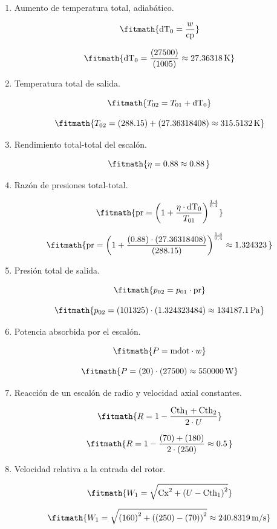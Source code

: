 \begin{enumerate}
\item Aumento de temperatura total, adiabático.

\[\fitmath{\mathrm{dT}_{0}=\frac{w}{\mathrm{cp}}}\]

\[\fitmath{\mathrm{dT}_{0}=\frac{(27500)}{(1005)}\approx 27.36318\,\mathrm{K}}\]

\item Temperatura total de salida.

\[\fitmath{T_{02}=T_{01}+\mathrm{dT}_{0}}\]

\[\fitmath{T_{02}=(288.15)+(27.36318408)\approx 315.5132\,\mathrm{K}}\]

\item Rendimiento total-total del escalón.

\[\fitmath{\eta=0.88\approx 0.88\,}\]

\item Razón de presiones total-total.

\[\fitmath{\mathrm{pr}={\left(1+\frac{\eta\cdot \mathrm{dT}_{0}}{T_{01}}\right)}^{\frac{1.4}{0.4}}}\]

\[\fitmath{\mathrm{pr}={\left(1+\frac{(0.88)\cdot (27.36318408)}{(288.15)}\right)}^{\frac{1.4}{0.4}}\approx 1.324323\,}\]

\item Presión total de salida.

\[\fitmath{p_{02}=p_{01}\cdot \mathrm{pr}}\]

\[\fitmath{p_{02}=(101325)\cdot (1.324323484)\approx 134187.1\,\mathrm{Pa}}\]

\item Potencia absorbida por el escalón.

\[\fitmath{P=\mathrm{mdot}\cdot w}\]

\[\fitmath{P=(20)\cdot (27500)\approx 550000\,\mathrm{W}}\]

\item Reacción de un escalón de radio y velocidad axial constantes.

\[\fitmath{R=1-\frac{\mathrm{Cth}_{1}+\mathrm{Cth}_{2}}{2\cdot U}}\]

\[\fitmath{R=1-\frac{(70)+(180)}{2\cdot (250)}\approx 0.5\,}\]

\item Velocidad relativa a la entrada del rotor.

\[\fitmath{W_{1}=\sqrt{{\mathrm{Cx}}^{2}+{\left(U-\mathrm{Cth}_{1}\right)}^{2}}}\]

\[\fitmath{W_{1}=\sqrt{{(160)}^{2}+{\left((250)-(70)\right)}^{2}}\approx 240.8319\,\mathrm{m/s}}\]


\end{enumerate}
